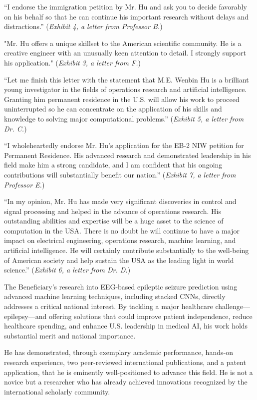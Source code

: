 \documentclass{article}
\begin{document}
“I endorse the immigration petition by Mr. Hu and ask you to decide favorably on his behalf so that he can continue his important research without delays and distractions.” ({\it Exhibit 4, a letter from Professor B.}) 

"Mr. Hu offers a unique skillset to the American scientific community. He is a creative engineer with an unusually keen attention to detail. I strongly support his application." ({\it Exhibit 3, a letter from F.}) 

“Let me finish this letter with the statement that M.E. Wenbin Hu is a brilliant young investigator in the fields of operations research and artificial intelligence. Granting him permanent residence in the U.S. will allow his work to proceed uninterrupted so he can concentrate on the application of his skills and knowledge to solving major computational problems.” ({\it Exhibit 5, a letter from Dr. C.}) 

“I wholeheartedly endorse Mr. Hu's application for the EB-2 NIW petition for Permanent Residence. His advanced research and demonstrated leadership in his field make him a strong candidate, and I am confident that his ongoing contributions will substantially benefit our nation.” ({\it Exhibit 7, a letter from Professor E.}) 

“In my opinion, Mr. Hu has made very significant discoveries in control and signal processing and helped in the advance of operations research. His outstanding abilities and expertise will be a huge asset to the science of computation in the USA. There is no doubt he will continue to have a major impact on electrical engineering, operations research, machine learning, and artificial intelligence. He will certainly contribute substantially to the well-being of American society and help sustain the USA as the leading light in world science.” ({\it Exhibit 6, a letter from Dr. D.}) 

The Beneficiary’s research into EEG-based epileptic seizure prediction using advanced machine learning techniques, including stacked CNNs, directly addresses a critical national interest. By tackling a major healthcare challenge—epilepsy—and offering solutions that could improve patient independence, reduce healthcare spending, and enhance U.S. leadership in medical AI, his work holds substantial merit and national importance.

He has demonstrated, through exemplary academic performance, hands-on research experience, two peer-reviewed international publications, and a patent application, that he is eminently well-positioned to advance this field. He is not a novice but a researcher who has already achieved innovations recognized by the international scholarly community.
\end{document}
